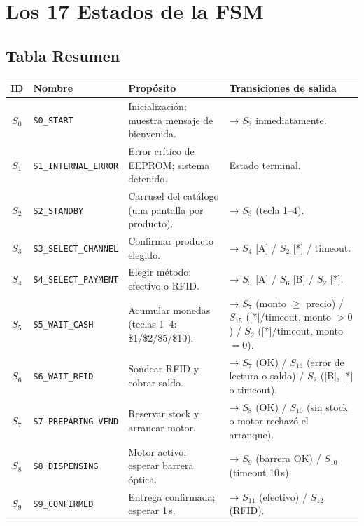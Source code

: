 \documentclass[12pt,a4paper]{article}
\begin{document}
\section{Los 17 Estados de la FSM}

\subsection{Tabla Resumen}

\begin{table}[H]
\centering
\small
\renewcommand{\arraystretch}{1.25}
\begin{tabular}{clp{4.2cm}p{4.2cm}}
\toprule
\textbf{ID} & \textbf{Nombre} & \textbf{Propósito} & \textbf{Transiciones de salida} \\
\midrule
$S_0$  & \texttt{S0\_START}      & Inicialización; muestra mensaje de bienvenida. & → $S_2$ inmediatamente. \\
$S_1$  & \texttt{S1\_INTERNAL\_ERROR}& Error crítico de EEPROM; sistema detenido.     & Estado terminal. \\
$S_2$  & \texttt{S2\_STANDBY}        & Carrusel del catálogo (una pantalla por producto). & → $S_3$ (tecla 1–4). \\
$S_3$  & \texttt{S3\_SELECT\_CHANNEL}    & Confirmar producto elegido.  & → $S_4$ [A] / $S_2$ [*] / timeout. \\
$S_4$  & \texttt{S4\_SELECT\_PAYMENT}     & Elegir método: efectivo o RFID. & → $S_5$ [A] / $S_6$ [B] / $S_2$ [*]. \\
$S_5$  & \texttt{S5\_WAIT\_CASH} & Acumular monedas (teclas 1–4: \$1/\$2/\$5/\$10). & → $S_7$ (monto $\geq$ precio) / $S_{15}$ ([*]/timeout, monto $>0$) / $S_2$ ([*]/timeout, monto $=0$). \\
$S_6$  & \texttt{S6\_WAIT\_RFID}     & Sondear RFID y cobrar saldo. & → $S_7$ (OK) / $S_{13}$ (error de lectura o saldo) / $S_2$ ([B], [*] o timeout). \\
$S_7$  & \texttt{S7\_PREPARING\_VEND}     & Reservar stock y arrancar motor. & → $S_8$ (OK) / $S_{10}$ (sin stock o motor rechazó el arranque). \\
$S_8$  & \texttt{S8\_DISPENSING}   & Motor activo; esperar barrera óptica.  & → $S_9$ (barrera OK) / $S_{10}$ (timeout 10\,s). \\
$S_9$  & \texttt{S9\_CONFIRMED}    & Entrega confirmada; esperar 1\,s. & → $S_{11}$ (efectivo) / $S_{12}$ (RFID). \\

\end{tabular}
\end{table}
\end{document}
